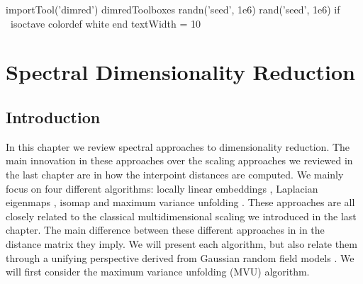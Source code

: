 \begin{matlab}
  importTool('dimred')
  dimredToolboxes
  randn('seed', 1e6)
  rand('seed', 1e6)
  if ~isoctave
    colordef white
  end
  textWidth = 10
\end{matlab}




\chapter{Spectral Dimensionality Reduction}


\section{Introduction}

In this chapter we review spectral approaches to dimensionality reduction. The main innovation in these approaches over the scaling approaches we reviewed in the last chapter are in how the interpoint distances are computed. We mainly focus on four different algorithms: locally linear embeddings \citep{Roweis:lle00}, Laplacian eigenmaps  \citep{Belkin:laplacian03}, isomap \cite{Tenebaum:isomap00} and maximum variance unfolding \citep{Weinberger:learning04}. These approaches  are all closely related to the classical multidimensional scaling we introduced in the last chapter. The main difference between these different approaches in in the distance matrix they imply. We will present each algorithm, but also relate them through a unifying perspective derived from Gaussian random field models \cite{Lawrence:unifying10}. We will first consider the maximum variance unfolding (MVU) algorithm.


